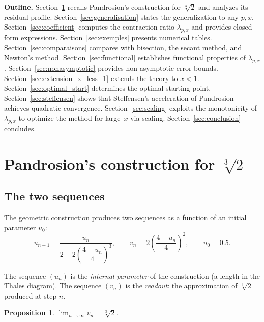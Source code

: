 \documentclass[10pt,a4paper,oneside]{book}
\newtheorem{proposition}[theorem]{Proposition}
\theoremstyle{definition}
\theoremstyle{remark}
\newcommand{\cbrt}[1]{\sqrt[3]{#1}}
\begin{document}
\textbf{Outline.} Section~\ref{sec:pandrosion3} recalls Pandrosion's construction for $\cbrt{2}$ and analyzes its residual profile. Section~\ref{sec:generalisation} states the generalization to any $p, x$. Section~\ref{sec:coefficient} computes the contraction ratio $\lambda_{p,x}$ and provides closed-form expressions. Section~\ref{sec:exemples} presents numerical tables. Section~\ref{sec:comparaisons} compares with bisection, the secant method, and Newton's method. Section~\ref{sec:functional} establishes functional properties of $\lambda_{p,x}$. Section~\ref{sec:nonasymptotic} provides non-asymptotic error bounds. Section~\ref{sec:extension_x_less_1} extends the theory to $x < 1$. Section~\ref{sec:optimal_start} determines the optimal starting point. Section~\ref{sec:steffensen} shows that Steffensen's acceleration of Pandrosion achieves quadratic convergence. Section~\ref{sec:scaling} exploits the monotonicity of $\lambda_{p,x}$ to optimize the method for large~$x$ via scaling. Section~\ref{sec:conclusion} concludes.

\section{Pandrosion's construction for \texorpdfstring{$\cbrt{2}$}{cbrt(2)}}
\label{sec:pandrosion3}

\subsection{The two sequences}

The geometric construction produces two sequences as a function of an initial parameter $u_0$:
\begin{equation}
  \label{eq:pandrosion_orig}
  u_{n+1} = \frac{u_n}{2 - 2\!\left(\dfrac{4 - u_n}{4}\right)^{\!3}},
  \qquad
  v_n = 2\!\left(\frac{4 - u_n}{4}\right)^{\!2},
  \qquad u_0 = 0.5.
\end{equation}

The sequence $(u_n)$ is the \emph{internal parameter} of the construction (a length in the Thales diagram). The sequence $(v_n)$ is the \emph{readout}: the approximation of $\cbrt{2}$ produced at step $n$.

\begin{proposition}
$\displaystyle\lim_{n\to\infty} v_n = \cbrt{2}$.
\end{proposition}
\end{document}
